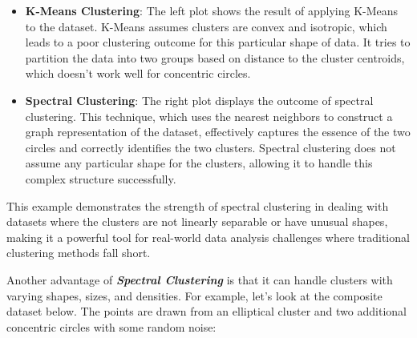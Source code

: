 \documentclass[11pt]{article}
\begin{document}
    \begin{itemize}
\item
  \textbf{K-Means Clustering}: The left plot shows the result of
  applying K-Means to the dataset. K-Means assumes clusters are convex
  and isotropic, which leads to a poor clustering outcome for this
  particular shape of data. It tries to partition the data into two
  groups based on distance to the cluster centroids, which doesn't work
  well for concentric circles.
\item
  \textbf{Spectral Clustering}: The right plot displays the outcome of
  spectral clustering. This technique, which uses the nearest neighbors
  to construct a graph representation of the dataset, effectively
  captures the essence of the two circles and correctly identifies the
  two clusters. Spectral clustering does not assume any particular shape
  for the clusters, allowing it to handle this complex structure
  successfully.
\end{itemize}

This example demonstrates the strength of spectral clustering in dealing
with datasets where the clusters are not linearly separable or have
unusual shapes, making it a powerful tool for real-world data analysis
challenges where traditional clustering methods fall short.

    Another advantage of \textbf{\emph{Spectral Clustering}} is that it can
handle clusters with varying shapes, sizes, and densities. For example,
let's look at the composite dataset below. The points are drawn from an
elliptical cluster and two additional concentric circles with some
random noise:
\end{document}

